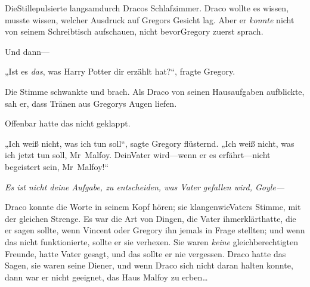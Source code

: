 DieStillepulsierte langsamdurch Dracos Schlafzimmer. Draco wollte es wissen, musste wissen, welcher Ausdruck auf Gregors Gesicht lag. Aber er \emph{konnte} nicht von seinem Schreibtisch aufschauen, nicht bevorGregory zuerst sprach.

Und dann—

„Ist es \emph{das}, was Harry Potter dir erzählt hat?“, fragte Gregory.

Die Stimme schwankte und brach. Als Draco von seinen Hausaufgaben aufblickte, sah er, dass Tränen aus Gregorys Augen liefen.

Offenbar hatte das nicht geklappt.

„Ich weiß nicht, was ich tun soll“, sagte Gregory flüsternd. „Ich weiß nicht, was ich jetzt tun soll, Mr~Malfoy. DeinVater wird—wenn er es erfährt—nicht begeistert sein, Mr~Malfoy!“

\emph{Es ist nicht \emph{deine} Aufgabe, zu entscheiden, was Vater gefallen wird, Goyle—}

Draco konnte die Worte in seinem Kopf hören; sie klangenwieVaters Stimme, mit der gleichen Strenge. Es war die Art von Dingen, die Vater ihmerklärthatte, die er sagen sollte, wenn Vincent oder Gregory ihn jemals in Frage stellten; und wenn das nicht funktionierte, sollte er sie verhexen. Sie waren \emph{keine} gleichberechtigten Freunde, hatte Vater gesagt, und das sollte er nie vergessen. Draco hatte das Sagen, sie waren seine Diener, und wenn Draco sich nicht daran halten konnte, dann war er nicht geeignet, das Haus Malfoy zu erben…

